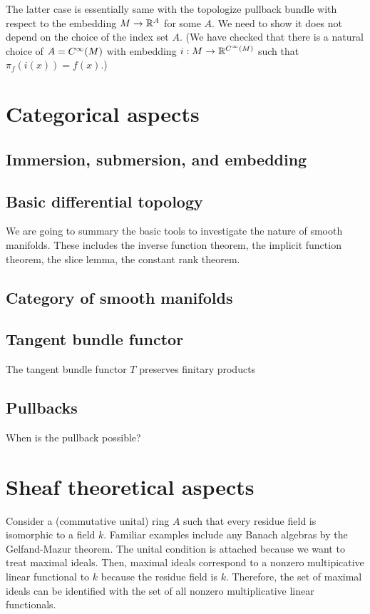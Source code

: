 \documentclass{../exp}
\begin{document}
The latter case is essentially same with the topologize pullback bundle with respect to the embedding $M\to\R^A$ for some $A$.
We need to show it does not depend on the choice of the index set $A$.
(We have checked that there is a natural choice of $A=C^\infty(M)$ with embedding $i:M\to\R^{C^\oo(M)}$ such that $\pi_f(i(x))=f(x)$.)










\section{Categorical aspects}

\subsection{Immersion, submersion, and embedding}


\subsection{Basic differential topology}
We are going to summary the basic tools to investigate the nature of smooth manifolds.
These includes the inverse function theorem, the implicit function theorem, the slice lemma, the constant rank theorem.

\subsection{Category of smooth manifolds}


\subsection{Tangent bundle functor}

\begin{thm}
The tangent bundle functor $T$ preserves finitary products
\end{thm}


\subsection{Pullbacks}
When is the pullback possible?








\section{Sheaf theoretical aspects}
Consider a (commutative unital) ring $A$ such that every residue field is isomorphic to a field $k$.
Familiar examples include any Banach algebras by the Gelfand-Mazur theorem.
The unital condition is attached because we want to treat maximal ideals.
Then, maximal ideals correspond to a nonzero multipicative linear functional to $k$ because the residue field is $k$.
Therefore, the set of maximal ideals can be identified with the set of all nonzero multiplicative linear functionals.
\end{document}
